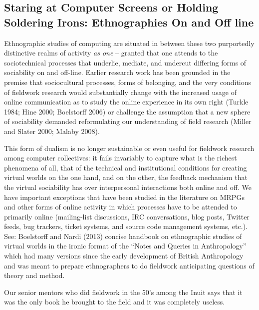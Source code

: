 \documentclass[10pt,letter,oneside]{scrartcl}
\begin{document}
\subsection{Staring at Computer Screens
  or Holding Soldering Irons: Ethnographies On and Off line}

Ethnographic studies of computing are situated in between these two
purportedly distinctive realms of activity \emph{as one} -- granted
that one attends to the sociotechnical processes that underlie,
mediate, and undercut differing forms of sociability on and
off-line. Earlier research work has been grounded in the premise that
sociocultural processes, forms of belonging, and the very conditions
of fieldwork research would substantially change with the increased
usage of online communication as to study the online experience in its
own right (Turkle 1984; Hine 2000; Boelstorff 2006) or challenge the
assumption that a new sphere of sociability demanded reformulating our
understanding of field research (Miller and Slater 2000; Malaby
2008).

This form of dualism is no longer sustainable or even useful for
fieldwork research among computer collectives: it fails invariably to
capture what is the richest phenomena of all, that of the technical
and institutional conditions for creating virtual worlds on the one
hand, and on the other, the feedback mechanism that the virtual
sociability has over interpersonal interactions both online and off.
We have important exceptions that have been studied in the literature
on MRPGs and other forms of online activity in which processes have to
be attended to primarily online (mailing-list discussions, IRC
conversations, blog posts, Twitter feeds, bug trackers, ticket
systems, and source code management systems, etc.). See: Boelstorff
and Nardi (2013) concise handbook on ethnographic studies of virtual
worlds in the ironic format of the ``Notes and Queries in
Anthropology'' which had many versions since the early development of
British Anthropology and was meant to prepare ethnographers to do
fieldwork anticipating questions of theory and method. 

Our senior mentors who did fieldwork in the 50's among the Inuit says
that it was the only book he brought to the field and it was
completely useless.  %


\end{document}
